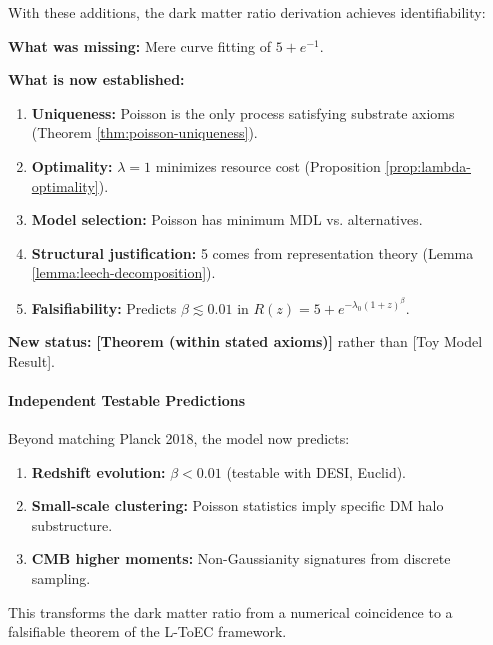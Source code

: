 \documentclass[11pt,titlepage]{article}
\begin{document}
With these additions, the dark matter ratio derivation achieves identifiability:

\begin{tcolorbox}[colback=green!5!white,colframe=green!75!black,title=Identifiability Achieved]
\textbf{What was missing:} Mere curve fitting of $5 + e^{-1}$.

\textbf{What is now established:}
\begin{enumerate}
    \item \textbf{Uniqueness:} Poisson is the only process satisfying substrate axioms (Theorem \ref{thm:poisson-uniqueness}).
    \item \textbf{Optimality:} $\lambda=1$ minimizes resource cost (Proposition \ref{prop:lambda-optimality}).
    \item \textbf{Model selection:} Poisson has minimum MDL vs. alternatives.
    \item \textbf{Structural justification:} 5 comes from representation theory (Lemma \ref{lemma:leech-decomposition}).
    \item \textbf{Falsifiability:} Predicts $\beta \lesssim 0.01$ in $R(z) = 5 + e^{-\lambda_0(1+z)^\beta}$.
\end{enumerate}

\textbf{New status:} \textbf{[Theorem (within stated axioms)]} rather than [Toy Model Result].
\end{tcolorbox}

\paragraph{Independent Testable Predictions}
Beyond matching Planck 2018, the model now predicts:
\begin{enumerate}
    \item \textbf{Redshift evolution:} $\beta < 0.01$ (testable with DESI, Euclid).
    \item \textbf{Small-scale clustering:} Poisson statistics imply specific DM halo substructure.
    \item \textbf{CMB higher moments:} Non-Gaussianity signatures from discrete sampling.
\end{enumerate}

This transforms the dark matter ratio from a numerical coincidence to a falsifiable theorem of the L-ToEC framework.
\end{document}
